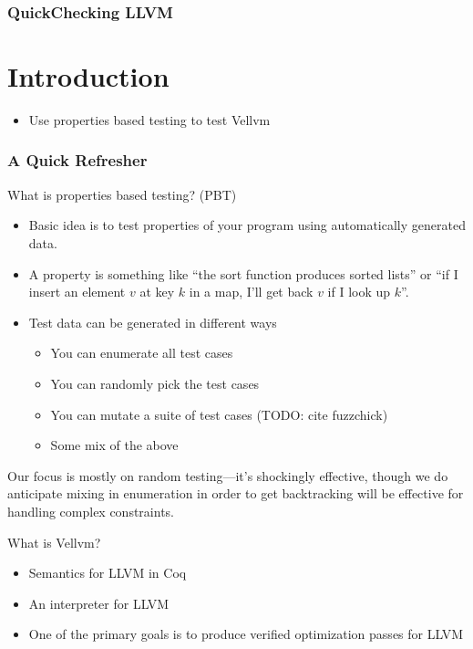 \documentclass{beamer}
\author{
  Beck, Calvin\\
  \href{mailto:hobbes@seas.upenn.edu}{hobbes@seas.upenn.edu}
  \and\\~\\
  Zakowski, Yannick\\
  \href{mailto:zakowski@seas.upenn.edu}{zakowski@seas.upenn.edu}
}
\begin{document}
\begin{frame}
  \frametitle{QuickChecking LLVM}
  \maketitle
\end{frame}

\section{Introduction}

\begin{frame}
  \begin{itemize}
  \item Use properties based testing to test Vellvm
  \end{itemize}
\end{frame}

\begin{frame}
  \frametitle{A Quick Refresher}
  What is properties based testing? (PBT)

  \begin{itemize}
  \item Basic idea is to test properties of your program using
    automatically generated data.
  \item A property is something like ``the sort function produces
    sorted lists'' or ``if I insert an element $v$ at key $k$ in a
    map, I'll get back $v$ if I look up $k$''.
  \item Test data can be generated in different ways
    \begin{itemize}
    \item You can enumerate all test cases
    \item You can randomly pick the test cases
    \item You can mutate a suite of test cases (TODO: cite fuzzchick)
      \pause
    \item Some mix of the above
    \end{itemize}
  \end{itemize}
  
  \pause
  
  Our focus is mostly on random testing---it's shockingly effective,
  though we do anticipate mixing in enumeration in order to get
  backtracking will be effective for handling complex constraints.
\end{frame}

\begin{frame}
  What is Vellvm?

  \begin{itemize}
  \item Semantics for LLVM in Coq
  \item An interpreter for LLVM
  \item One of the primary goals is to produce verified optimization
    passes for LLVM
  \end{itemize}
\end{frame}
\end{document}
